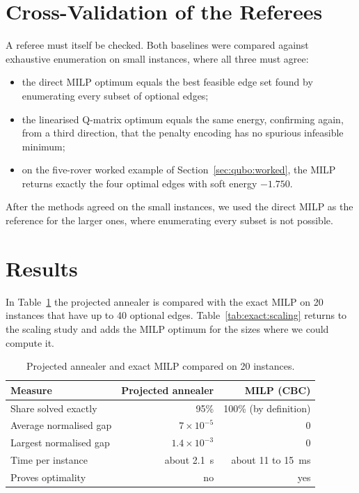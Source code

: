 \section{Cross-Validation of the Referees}

A referee must itself be checked. Both baselines were compared against
exhaustive enumeration on small instances, where all three must agree:

\begin{itemize}
\item the direct MILP optimum equals the best feasible edge set found by
enumerating every subset of optional edges;
\item the linearised Q-matrix optimum equals the same energy, confirming
again, from a third direction, that the penalty encoding has no spurious
infeasible minimum;
\item on the five-rover worked example of Section~\ref{sec:qubo:worked}, the
MILP returns exactly the four optimal edges with soft energy $-1.750$.
\end{itemize}

After the methods agreed on the small instances, we used the direct MILP as
the reference for the larger ones, where enumerating every subset is not
possible.

\section{Results}

In Table~\ref{tab:exact:summary} the projected annealer is compared with the
exact MILP on 20 instances that have up to 40 optional edges.
Table~\ref{tab:exact:scaling} returns to the scaling study and adds the MILP
optimum for the sizes where we could compute it.

\begin{table}[htbp]
\centering
\caption{Projected annealer and exact MILP compared on 20 instances.}
\label{tab:exact:summary}
\small
\begin{tabular}{@{}l r r@{}}
\toprule
Measure & Projected annealer & MILP (CBC) \\
\midrule
Share solved exactly & 95\% & 100\% (by definition) \\
Average normalised gap & $7\times10^{-5}$ & 0 \\
Largest normalised gap & $1.4\times10^{-3}$ & 0 \\
Time per instance & about 2.1~s & about 11 to 15~ms \\
Proves optimality & no & yes \\
\bottomrule
\end{tabular}
\end{table}

